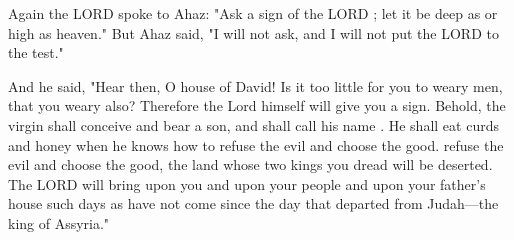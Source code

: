 \documentclass[11pt]{article}
\begin{document}
\begin{chiasticoutline}[Isaiah 7:7-9]{.95em}{2em}

    
    
    
    

\end{chiasticoutline}



\begin{biblicaloutline}[Isaiah 7:10-17]

    
    \begin{versesection}{2em}
         Again the LORD spoke to Ahaz:  "Ask a sign of the LORD ; let it be deep as  or high as heaven."  But Ahaz said, "I will not ask, and I will not put the LORD to the test."
    \end{versesection}
    
    
    \begin{versesection}{2em}
         And he said, "Hear then, O house of David! Is it too little for you to weary men, that you weary  also?  Therefore the Lord himself will give you a sign. Behold, the virgin shall conceive and bear a son, and shall call his name .  He shall eat curds and honey when he knows how to refuse the evil and choose the good.   refuse the evil and choose the good, the land whose two kings you dread will be deserted.  The LORD will bring upon you and upon your people and upon your father's house such days as have not come since the day that  departed from Judah—the king of Assyria."
    \end{versesection}

\end{biblicaloutline}
\end{document}
